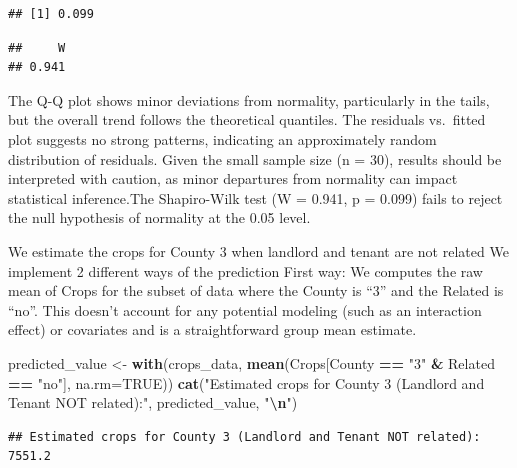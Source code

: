 \documentclass[
  11pt,
]{article}
\newenvironment{Shaded}{\begin{snugshade}}{\end{snugshade}}
\newcommand{\AttributeTok}[1]{\textcolor[rgb]{0.13,0.29,0.53}{#1}}
\newcommand{\ConstantTok}[1]{\textcolor[rgb]{0.56,0.35,0.01}{#1}}
\newcommand{\DecValTok}[1]{\textcolor[rgb]{0.00,0.00,0.81}{#1}}
\newcommand{\FunctionTok}[1]{\textcolor[rgb]{0.13,0.29,0.53}{\textbf{#1}}}
\newcommand{\NormalTok}[1]{#1}
\newcommand{\OtherTok}[1]{\textcolor[rgb]{0.56,0.35,0.01}{#1}}
\newcommand{\SpecialCharTok}[1]{\textcolor[rgb]{0.81,0.36,0.00}{\textbf{#1}}}
\newcommand{\StringTok}[1]{\textcolor[rgb]{0.31,0.60,0.02}{#1}}
\begin{document}
\begin{verbatim}
## [1] 0.099
\end{verbatim}

\begin{Shaded}
\end{Shaded}

\begin{verbatim}
##     W 
## 0.941
\end{verbatim}

The Q-Q plot shows minor deviations from normality, particularly in the
tails, but the overall trend follows the theoretical quantiles. The
residuals vs.~fitted plot suggests no strong patterns, indicating an
approximately random distribution of residuals. Given the small sample
size (n = 30), results should be interpreted with caution, as minor
departures from normality can impact statistical inference.The
Shapiro-Wilk test (W = 0.941, p = 0.099) fails to reject the null
hypothesis of normality at the 0.05 level.

We estimate the crops for County 3 when landlord and tenant are not
related We implement 2 different ways of the prediction First way: We
computes the raw mean of Crops for the subset of data where the County
is ``3'' and the Related is ``no''. This doesn't account for any
potential modeling (such as an interaction effect) or covariates and is
a straightforward group mean estimate.

\begin{Shaded}
\begin{Highlighting}[]
\NormalTok{predicted\_value }\OtherTok{\textless{}{-}} \FunctionTok{with}\NormalTok{(crops\_data, }\FunctionTok{mean}\NormalTok{(Crops[County }\SpecialCharTok{==} \StringTok{"3"} \SpecialCharTok{\&}\NormalTok{ Related }\SpecialCharTok{==} \StringTok{"no"}\NormalTok{], }\AttributeTok{na.rm=}\ConstantTok{TRUE}\NormalTok{))}
\FunctionTok{cat}\NormalTok{(}\StringTok{"Estimated crops for County 3 (Landlord and Tenant NOT related):"}\NormalTok{, predicted\_value, }\StringTok{"}\SpecialCharTok{\textbackslash{}n}\StringTok{"}\NormalTok{)}
\end{Highlighting}
\end{Shaded}

\begin{verbatim}
## Estimated crops for County 3 (Landlord and Tenant NOT related): 7551.2
\end{verbatim}
\end{document}
